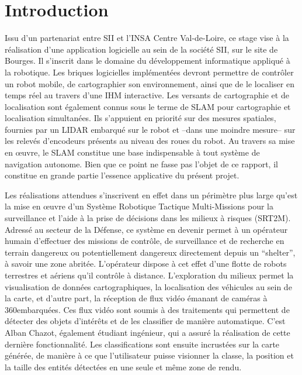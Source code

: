 \chapter*{Introduction}


Issu d’un partenariat entre \gls{SII} et l’INSA Centre Val-de-Loire, ce stage vise à la réalisation d’une application logicielle au sein de la société SII, sur le site de Bourges. 
Il s’inscrit dans le domaine du développement informatique appliqué à la robotique. 
Les briques logicielles implémentées devront permettre de contrôler un robot mobile, de cartographier son environnement, ainsi que de le localiser en temps réel au travers d'une \gls{IHM} interactive. 
Les versants de cartographie et de localisation sont également connus sous le terme de \gls{SLAM} pour cartographie et localisation simultanées. 
Ils s’appuient en priorité sur des mesures spatiales, fournies par un \gls{LIDAR} embarqué sur le robot et --dans une moindre mesure-- sur les relevés d'encodeurs présents au niveau des roues du robot.
Au travers sa mise en \oe{}uvre, le \gls{SLAM} constitue une base indispensable à tout système de navigation autonome. 
Bien que ce point ne fasse pas l'objet de ce rapport, il constitue en grande partie l'essence applicative du présent projet. 

Les réalisations attendues s'inscrivent en effet dans un périmètre plus large qu’est la mise en \oe{}uvre d’un Système Robotique Tactique Multi-Missions pour la surveillance et l’aide à la prise de décisions dans les milieux à risques (\gls{SRT2M}).
Adressé au secteur de la Défense, ce système en devenir permet à un opérateur humain d’effectuer des missions de contrôle, de surveillance et de recherche en terrain dangereux ou potentiellement dangereux directement depuis un ``shelter'', à savoir une zone abritée. 
L’opérateur dispose à cet effet d’une flotte de robots terrestres et aériens qu’il contrôle à distance. 
L'exploration du milieux permet la visualisation de données cartographiques, la localisation des véhicules au sein de la carte, et d’autre part, la réception
de flux vidéo émanant de caméras à 360\degre embarquées. 
Ces flux vidéo sont soumis à des traitements qui permettent de détecter des objets d’intérêts et de les classifier de manière automatique. 
C'est Alban Chazot, également étudiant ingénieur, qui a assuré la réalisation de cette dernière fonctionnalité.   
Les classifications sont ensuite incrustées sur la carte générée, de manière à ce que l'utilisateur puisse visionner la classe, la position et la taille des entités détectées en une seule et même zone de rendu. 

